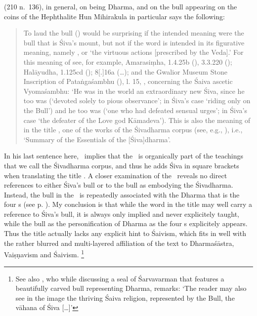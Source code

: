 \documentclass[11pt]{book}
\begin{document}
 (210 n.~136), in general,
on  being Dharma, and
on the bull appearing on the coins of the 
Hephthalite Hun Mihirakula in particular says the following: 

\begin{quote}
{\footnotesize
To laud the bull () 
would be surprising if the intended meaning were 
the bull that is Śiva's mount, but not if the word is intended in its figurative meaning, namely , 
or  `the virtuous actions [prescribed by
the Veda].' For this meaning of  see, for example,
Amarasiṃha,  
1.4.25b (),
3.3.220 (); 
Halāyudha,
 1.125cd (); 
 8[.]16a
(\dots); 
and the Gwalior Museum Stone
Inscription of Pataṅgaśambhu (), l. 15,
, 
concerning the Śaiva ascetic Vyomaśambhu: 
`He was in the
world an extraordinary new Śiva, since he too was 
(`devoted solely to pious observance'; 
in Śiva's case `riding only on the Bull') and he too was 
 (`one who had defeated sensual
urges'; in Śiva's case `the defeater of the Love god Kāmadeva'). 
This is also the meaning of  in the title \Vss,
one of the works of the Śivadharma corpus 
(see, e.g., ), i.e., 
`Summary of the Essentials of the [Śiva]dharma'. 
}
\end{quote}

\noindent
In his last sentence here, \Sanderson\ implies that the
\Vss\ is organically part of the teachings that we call
the Śivadharma corpus, and thus he adds Śiva in
square brackets when translating the title 
\Vss. A closer examination of the \VSS\ 
reveals no direct references to either Śiva's bull or
to the bull as embodying the Śivadharma. Instead, the bull
in the \VSS\ is repeatedly associated with the Dharma that
is the four \asrama s (see p. \pageref{bullasfourasramas}).
My conclusion is that while the word  in the
title may well carry a reference to Śiva's bull, it is always
only implied and never explicitely taught, while the bull as
the personification of Dharma as the four
\asrama s explicitely appears. Thus
the title actually lacks any explicit hint to Śaivism, which
fits in well with the rather blurred and multi-layered 
affiliation of the text to Dharmaśāstra, Vaiṣṇavism and Śaivism.%
		\footnote{See also , who 
			while discussing a seal of Śarvavarman that 
			features a beautifully carved bull representing Dharma,
			remarks: `The reader may also see in the 
			image the thriving Śaiva religion, represented
			by the Bull, the vāhana of Śiva [\dots]'} 
\end{document}
